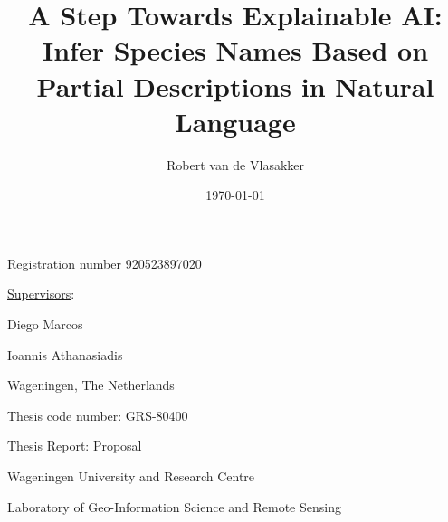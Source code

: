 \documentclass[a4paper, 12pt, oneside]{book} %
\title{A Step Towards Explainable AI: Infer Species Names Based on Partial Descriptions in Natural Language}
\author{Robert van de Vlasakker}
\date{\today}
\begin{document}
 \begin{titlingpage}


  \thispagestyle{empty}
  
  \begin{center}
  {\bfseries \Large \thetitle}
  \newline
  \newline
  \newline
  \newline
  
  {\Large \theauthor}\vspace{0.8cm}
  
  {Registration number 920523897020}\vspace{2.5cm}
  
  {\large \underline{Supervisors}:}\vspace{1.1cm}
  
  {Diego Marcos}
  
  {Ioannis Athanasiadis}\vspace{3.0cm}
  
  
  
  \end{center}
  
  \begin{center}
    {\thedate}
  
    {Wageningen, The Netherlands}
  \end{center}\vspace{6cm}

    Thesis code number: GRS-80400
  
    Thesis Report: Proposal
  
    {Wageningen University and Research Centre}
  
    {Laboratory of Geo-Information Science and Remote Sensing}
 \end{titlingpage}
\graphicspath{ {./figures/} }



\thispagestyle{empty}
\tableofcontents
\thispagestyle{empty}
\listoffigures
\thispagestyle{empty}
\listoftables
\thispagestyle{empty}
\newpage
\end{document}
